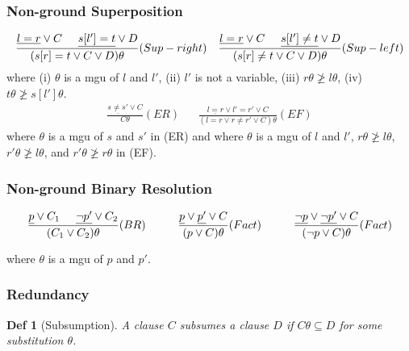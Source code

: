 \documentclass[]{article}
\newtheorem*{definition*}{Def}
\begin{document}
\subsubsection{Non-ground Superposition}

\begin{align*}
	\frac{\underline{l=r} \lor C \hspace{.5cm} \underline{s[l']=t} \lor D}{(s[r]=t \lor C \lor D)\theta} (Sup-right) && \frac{\underline{l=r} \lor C \hspace{.5cm} \underline{s[l']\not=t} \lor D}{(s[r]\not=t \lor C \lor D)\theta} (Sup-left)\\
\end{align*}
where (i) $\theta$ is a mgu of $l$ and $l'$, (ii) $l'$ is not a variable, (iii) $r\theta \not\geq l\theta$, (iv) $t\theta\not\geq s[l']\theta$.
\begin{align*}
	\frac{\underline{s\not= s'} \lor C}{C\theta} (ER) && \frac{\underline{l=r} \lor l'=r' \lor C}{(l=r \lor r\not= r' \lor C)\theta} (EF)
\end{align*}
where $\theta$ is a mgu of $s$ and $s'$ in (ER) and where $\theta$ is a mgu of $l$ and $l'$, $r\theta \not\geq l\theta$, $r'\theta \not\geq l\theta$, and $r'\theta \not\geq r\theta$ in (EF).


\subsubsection{Non-ground Binary Resolution}

\begin{align*}
	\frac{\underline{p}\lor C_1 \hspace{.5cm} \underline{\lnot p'} \lor C_2}{(C_1 \lor C_2)\theta} (BR) \hspace{1cm} \frac{\underline{p}\lor \underline{p'} \lor C}{(p \lor C)\theta} (Fact) \hspace{1cm} \frac{\underline{\lnot p}\lor \underline{\lnot p'} \lor C}{(\lnot p \lor C)\theta} (Fact)
\end{align*}

where $\theta$ is a mgu of $p$ and $p'$.

\subsubsection{Redundancy}

\begin{definition*}[Subsumption]
	A clause $C$ subsumes a clause $D$ if $C\theta \subseteq D$ for some substitution $\theta$.
\end{definition*}
\end{document}
